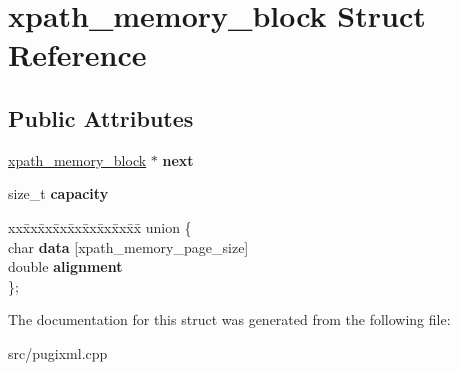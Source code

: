 \hypertarget{structxpath__memory__block}{}\section{xpath\+\_\+memory\+\_\+block Struct Reference}
\label{structxpath__memory__block}
\subsection*{Public Attributes}
\begin{DoxyCompactItemize}
\item 
\mbox{\label{structxpath__memory__block_ab7f0d8400b40a51cdb063e76fd19a93c}} 
\hyperlink{structxpath__memory__block}{xpath\+\_\+memory\+\_\+block} $\ast$ {\bfseries next}
\item 
\mbox{\label{structxpath__memory__block_ab3adef89fe1cb7c50ca6ce5708ff9316}} 
size\+\_\+t {\bfseries capacity}
\item 
\mbox{\label{structxpath__memory__block_a916b16655b3861b7f5d78a8d052f71b8}} 
\begin{tabbing}
xx\=xx\=xx\=xx\=xx\=xx\=xx\=xx\=xx\=\kill
union \{\\
\>char {\bfseries data} \mbox{[}xpath\_memory\_page\_size\mbox{]}\\
\>double {\bfseries alignment}\\
\}; \\

\end{tabbing}\end{DoxyCompactItemize}


The documentation for this struct was generated from the following file\+:\begin{DoxyCompactItemize}
\item 
src/pugixml.\+cpp\end{DoxyCompactItemize}
